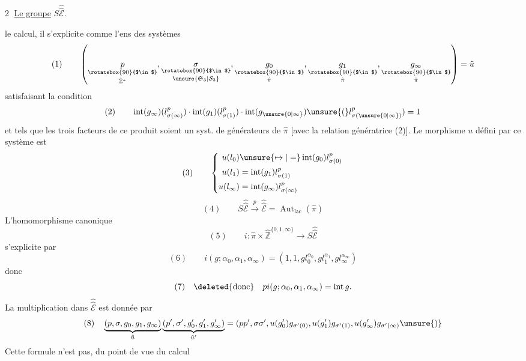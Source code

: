 \textcircled{2} \uline{Le groupe} $S\widehat{\widehat{\mathcal E}}$.

 le calcul, il s'explicite comme l'ens des systèmes
\[
(1)\qquad\left(\underset{\hat{\mathbb Z}^{*}}{\underset{\rotatebox{90}{$\in$}}{p}},\underset{\unsure{\mathfrak S_3|\mathcal S_3}}{\underset{\rotatebox{90}{$\in$}}{\sigma}},\underset{\hat\pi}{\underset{\rotatebox{90}{$\in$}}{g_0}},\underset{\hat\pi}{\underset{\rotatebox{90}{$\in$}}{g_1}},\underset{\hat\pi}{\underset{\rotatebox{90}{$\in$}}{g_\infty}}\right)=\tilde u
\]
satisfaisant la condition
\[
(2)\qquad\operatorname{int}(g_\infty)(l_{\sigma(\infty)}^p)\cdot\operatorname{int}(g_1)(l_{\sigma(1)}^p)\cdot\operatorname{int}(g_{\unsure{0|\infty}})\unsure{(}l_{\sigma(\unsure{0|\infty})}^p)=1
\]
et tels que les trois facteurs de ce produit soient un syst. de générateurs de $\hat\pi$ [avec la relation génératrice (2)]. Le morphisme $u$ défini par ce  système est
\[
(3)\qquad\left\{\begin{aligned}
u(l_0)&\unsure{\mapsto|=}\operatorname{int}(g_0)l_{\sigma(0)}^p\\
u(l_1)&=\operatorname{int}(g_1)l_{\sigma(1)}^p\\
u(l_\infty)&=\operatorname{int}(g_\infty)l_{\sigma(\infty)}^p
\end{aligned}\right.
\]
\[
(4)\qquad S\widehat{\widehat{\mathcal E}}\xrightarrow{p}\widehat{\widehat{\mathcal E}}=\operatorname{Aut}_{\mathrm{lac}}(\hat\pi)
\]
L'homomorphisme canonique
\[
(5)\qquad i:\hat\pi\times\hat{\mathbb Z}^{\{0,1,\infty\}}\longrightarrow S\widehat{\widehat{\mathcal E}}
\]
s'explicite par
\[
(6)\qquad i(g;\alpha_0,\alpha_1,\alpha_\infty)=(1,1,gl_0^{\alpha_0},gl_1^{\alpha_1},gl_\infty^{\alpha_\infty})
\]
donc
\[
(7)\quad\deleted{\text{donc}}\quad pi(g;\alpha_0,\alpha_1,\alpha_\infty)=\operatorname{int}g.
\]
La multiplication dans $\widehat{\widehat{\mathcal E}}$ est donnée par
\[
(8)\quad\underbrace{(p,\sigma,g_0,g_1,g_\infty)}_{\tilde u}\underbrace{(p',\sigma',g'_0,g'_1,g'_\infty)}_{\tilde u'}=(pp',\sigma\sigma',u(g'_0)g_{\sigma'(0)},u(g'_1)g_{\sigma'(1)},u(g'_\infty)g_{\sigma'(\infty)}\unsure{)}
\]
Cette formule n'est pas, du point de vue du calcul
